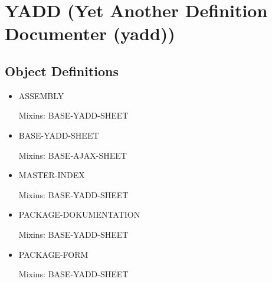 \documentclass [11pt]{book}
\begin{document}
\section{YADD (Yet Another Definition Documenter (yadd))}

\label{sec:yadd(yetanotherdefinitiondocumenter(yadd))}





\subsection{Object Definitions}

\label{subsec:objectdefinitions}



\begin{itemize}

\item {}ASSEMBLY

Mixins: BASE-YADD-SHEET



\item {}BASE-YADD-SHEET

Mixins: BASE-AJAX-SHEET



\item {}MASTER-INDEX

Mixins: BASE-YADD-SHEET



\item {}PACKAGE-DOKUMENTATION

Mixins: BASE-YADD-SHEET



\item {}PACKAGE-FORM

Mixins: BASE-YADD-SHEET



\end{itemize}





\backmatter



\printindex
\end{document}

